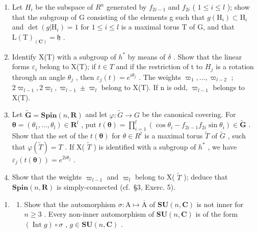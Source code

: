 \begin{enumerate}
\def\labelenumi{\alph{enumi})}
\tightlist
\item
  Let \(H_{i}\) be the subspace of \(R^{n}\) generated by \(f_{2i-1}\) and \(f_{2i}\) ( \(1 \leq i \leq l\) ); show that the subgroup of G consisting of the elements g such that \(g(\mathrm{H}_{i}) \subset \mathrm{H}_{i}\) and \(\det(g|\mathrm{H}_{i}) = 1\) for \(1 \leq i \leq l\) is a maximal torus T of G, and that \(\mathrm{L}(\mathrm{T})_{(\mathbf{C})} = \mathfrak{h}\) .
\item
  Identify X(T) with a subgroup of \(h^{*}\) by means of \(\delta\) . Show that the linear forms \(\varepsilon_{i}\) belong to X(T); if \(t \in T\) and if the restriction of t to \(H_{j}\) is a rotation through an angle \(\theta_{j}\) , then \(\varepsilon_{j}(t) = e^{i\theta_{j}}\) . The weights \(\varpi_{1}, \ldots, \varpi_{l-2}\) ; \(2\varpi_{l-1}, 2\varpi_{l}, \varpi_{l-1} \pm \varpi_{l}\) belong to X(T). If n is odd, \(\varpi_{l-1}\) belongs to X(T).
\item
  Let \(\tilde{\mathbf{G}} = \mathbf{Spin}(n, \mathbf{R})\) and let \(\varphi : \tilde{G} \to G\) be the canonical covering. For \(\boldsymbol{\theta} = (\theta_{1}, \ldots, \theta_{l}) \in \mathbf{R}^{l}\) , put \(t(\boldsymbol{\theta}) = \prod_{i=1}^{l} (\cos\theta_{i} - f_{2i-1}f_{2i}\sin\theta_{i}) \in \tilde{\mathbf{G}}\) . Show that the set of the \(t(\boldsymbol{\theta})\) for \(\theta \in R^{l}\) is a maximal torus \(\tilde{T}\) of \(\tilde{G}\) , such that \(\varphi(\tilde{T}) = T\) . If X( \(\tilde{T}\) ) is identified with a subgroup of \(h^{*}\) , we have \(\varepsilon_{j}(t(\boldsymbol{\theta})) = e^{2i\theta_{j}}\) .
\item
  Show that the weights \(\varpi_{l-1}\) and \(\varpi_{l}\) belong to X( \(\tilde{T}\) ); deduce that \(\mathbf{Spin}(n,\mathbf{R})\) is simply-connected (cf.~§3, Exerc. 5).
\end{enumerate}

\begin{enumerate}
\def\labelenumi{\arabic{enumi})}
\setcounter{enumi}{2}
\tightlist
\item
  \begin{enumerate}
  \def\labelenumii{\alph{enumii})}
  \tightlist
  \item
    Show that the automorphism \(\sigma: \mathrm{A} \mapsto \overline{\mathrm{A}}\) of \(\mathbf{SU}(n, \mathbf{C})\) is not inner for \(n \geq 3\) . Every non-inner automorphism of \(\mathbf{SU}(n, \mathbf{C})\) is of the form \((\operatorname{Int} g) \circ \sigma\) , \(g \in \mathbf{SU}(n, \mathbf{C})\) .
  \end{enumerate}
\end{enumerate}


